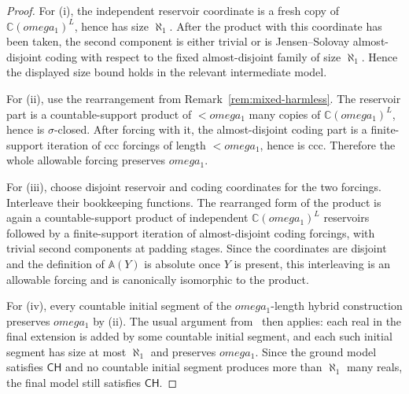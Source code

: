 \documentclass{article}
\theoremstyle{remark}
\theoremstyle{plain}
\newcommand{\CH}{\mathsf{CH}}
\def\omega{omega}%
\begin{document}
\begin{proof}
For (i), the independent reservoir coordinate is a fresh copy of $\mathbb C(\omega_1)^L$, hence has size $\aleph_1$. After the product with this coordinate has been taken, the second component is either trivial or is Jensen--Solovay almost-disjoint coding with respect to the fixed almost-disjoint family of size $\aleph_1$. Hence the displayed size bound holds in the relevant intermediate model.

For (ii), use the rearrangement from Remark~\ref{rem:mixed-harmless}. The reservoir part is a countable-support product of $<\omega_1$ many copies of $\mathbb C(\omega_1)^L$, hence is $\sigma$-closed. After forcing with it, the almost-disjoint coding part is a finite-support iteration of ccc forcings of length $<\omega_1$, hence is ccc. Therefore the whole allowable forcing preserves $\omega_1$.

For (iii), choose disjoint reservoir and coding coordinates for the two forcings. Interleave their bookkeeping functions. The rearranged form of the product is again a countable-support product of independent $\mathbb C(\omega_1)^L$ reservoirs followed by a finite-support iteration of almost-disjoint coding forcings, with trivial second components at padding stages. Since the coordinates are disjoint and the definition of $\mathbb A(Y)$ is absolute once $Y$ is present, this interleaving is an allowable forcing and is canonically isomorphic to the product.

For (iv), every countable initial segment of the $\omega_1$-length hybrid construction preserves $\omega_1$ by (ii). The usual argument from~\cite{HOFFELNER2023103292} then applies: each real in the final extension is added by some countable initial segment, and each such initial segment has size at most $\aleph_1$ and preserves $\omega_1$. Since the ground model satisfies $\CH$ and no countable initial segment produces more than $\aleph_1$ many reals, the final model still satisfies $\CH$.


\end{proof}
\end{document}
